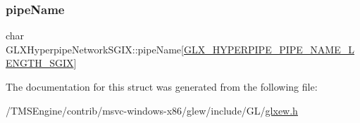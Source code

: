 \subsubsection{\texorpdfstring{pipe\+Name}{pipeName}}
{\footnotesize\ttfamily char G\+L\+X\+Hyperpipe\+Network\+S\+G\+I\+X\+::pipe\+Name\mbox{[}\hyperlink{glxew_8h_ae1c8261c0861010d8003a31d07e26005}{G\+L\+X\+\_\+\+H\+Y\+P\+E\+R\+P\+I\+P\+E\+\_\+\+P\+I\+P\+E\+\_\+\+N\+A\+M\+E\+\_\+\+L\+E\+N\+G\+T\+H\+\_\+\+S\+G\+IX}\mbox{]}}



The documentation for this struct was generated from the following file\+:\begin{DoxyCompactItemize}
\item 
/\+T\+M\+S\+Engine/contrib/msvc-\/windows-\/x86/glew/include/\+G\+L/\hyperlink{glxew_8h}{glxew.\+h}\end{DoxyCompactItemize}
